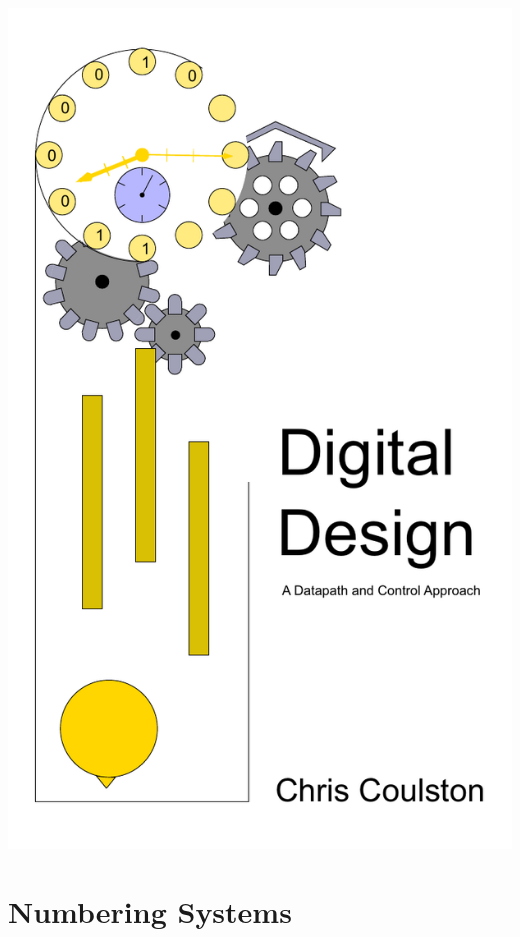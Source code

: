 \documentclass[letterpaper, 10pt]{memoir}
\begin{document}
\frontmatter
 \title{}
\includegraphics{./Fig/colorCover}
 \maketitle
 
 

\tableofcontents
\showanswers

\mainmatter

\chapter{Numbering Systems}

\end{document}
